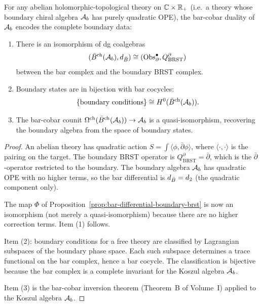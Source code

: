 \begin{theorem}
For any abelian holomorphic-topological theory on $\mathbb{C} \times \mathbb{R}_+$
(i.e.\ a theory whose boundary chiral algebra $\mathcal{A}_b$ has purely
quadratic OPE), the bar-cobar duality of $\mathcal{A}_b$ encodes the complete
boundary data:
\begin{enumerate}
\item There is an isomorphism of dg coalgebras
 \[
 (\bar{B}^{\mathrm{ch}}(\mathcal{A}_b), d_{\bar{B}}) \cong
 (\operatorname{Obs}^\bullet_\partial, Q_{\mathrm{BRST}}^\partial)
 \]
 between the bar complex and the boundary BRST complex.
\item Boundary states are in bijection with bar cocycles:
 \[
 \{\text{boundary conditions}\} \cong H^0(\bar{B}^{\mathrm{ch}}(\mathcal{A}_b)).
 \]
\item The bar-cobar counit $\Omega^{\mathrm{ch}}(\bar{B}^{\mathrm{ch}}(\mathcal{A}_b)) \to \mathcal{A}_b$ is a
 quasi-isomorphism, recovering the boundary algebra from the space
 of boundary states.
\end{enumerate}
\end{theorem}

\begin{proof}
An abelian theory has quadratic action $S = \int \langle \phi,
\bar{\partial} \phi \rangle$, where $\langle \cdot, \cdot \rangle$
is the pairing on the target. The boundary BRST operator is
$Q_{\mathrm{BRST}}^\partial = \bar{\partial}$, which is the
$\bar{\partial}$-operator restricted to the boundary. The boundary
algebra $\mathcal{A}_b$ has quadratic OPE with no higher terms, so the bar
differential is $d_{\bar{B}} = d_2$ (the quadratic component only).

The map $\Phi$ of Proposition~\ref{prop:bar-differential-boundary-brst}
is now an isomorphism (not merely a quasi-isomorphism) because there are
no higher correction terms. Item (1) follows.

Item (2): boundary conditions for a free theory are classified by
Lagrangian subspaces of the boundary phase space. Each such subspace
determines a trace functional on the bar complex, hence a bar cocycle.
The classification is bijective because the bar complex is a complete
invariant for the Koszul algebra $\mathcal{A}_b$.

Item (3) is the bar-cobar inversion theorem (Theorem~B of Volume~I)
applied to the Koszul algebra $\mathcal{A}_b$.
\end{proof}

